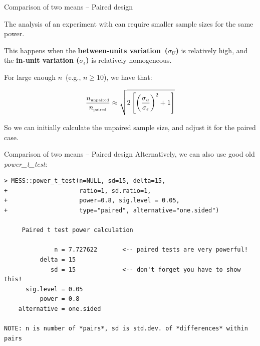 
\begin{frame}{Comparison of two means -- Paired design}{}


  The analysis of an experiment with  can
  require smaller sample sizes for the same power.\bigskip

  This happens when the {\bf between-units variation~($\sigma_U$)} is relatively
  high, and the {\bf in-unit variation ($\sigma_\epsilon$)} is relatively
  homogeneous.\bigskip

  For large enough $n$~(e.g., $n\geq 10$), we have that:

\begin{equation*}
\frac{n_{\mbox{\tiny unpaired}}}{n_{\mbox{\tiny paired}}}\approx\sqrt{2\left[\left(\frac{\sigma_u}{\sigma_\epsilon}\right)^2+1\right]}
\end{equation*}

  So we can initially calculate the unpaired sample size, and adjust it for the paired case.
\end{frame}

\begin{frame}[fragile]{Comparison of two means -- Paired design}{}
  Alternatively, we can also use good old \emph{power\_t\_test}:

{\small
\begin{verbatim}
> MESS::power_t_test(n=NULL, sd=15, delta=15, 
+                    ratio=1, sd.ratio=1,
+                    power=0.8, sig.level = 0.05,
+                    type="paired", alternative="one.sided")

     Paired t test power calculation 

              n = 7.727622       <-- paired tests are very powerful!
          delta = 15
             sd = 15             <-- don't forget you have to show this!
      sig.level = 0.05
          power = 0.8
    alternative = one.sided

NOTE: n is number of *pairs*, sd is std.dev. of *differences* within pairs
\end{verbatim}
}
\end{frame}


